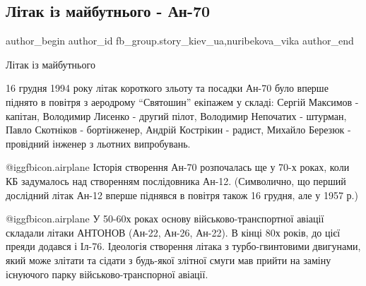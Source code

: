  
 
 
 
 
 
\subsection{Літак із майбутнього - Ан-70}
\label{sec:16_11_2021.fb.fb_group.story_kiev_ua.2.an70}
 
\ifcmt
 author_begin
   author_id fb_group.story_kiev_ua,nuribekova_vika
 author_end
\fi

Літак із майбутнього

16 грудня 1994 року літак короткого зльоту та посадки Ан-70 було вперше піднято
в повітря з аеродрому \enquote{Святошин} екіпажем у складі: Сергій Максимов - капітан,
Володимир Лисенко - другий пілот, Володимир Непочатих - штурман, Павло
Скотніков - бортінженер, Андрій Кострікин - радист, Михайло Березюк - провідний
інженер з льотних випробувань.

\begin{multicols}{2} %
\setlength{\parindent}{0pt}


\end{multicols} %

@igg{fbicon.airplane} Історія створення Ан-70 розпочалась ще у 70-х роках, коли
КБ задумалось над створенням послідовника Ан-12. (Символично, що перший
дослідний літак Ан-12 вперше піднявся в повітря також 16 грудня, але у 1957 р.)

@igg{fbicon.airplane}  У 50-60х роках основу військово-транспортної авіації
складали літаки АНТОНОВ (Ан-22, Ан-26, Ан-22). В кінці 80х років, до цієї
преяди додався і Іл-76. Ідеологія  створення літака з турбо-гвинтовими
двигунами, який може злітати та сідати з будь-якої злітної смуги мав прийти на
заміну існуючого парку військово-транспорної авіації.

